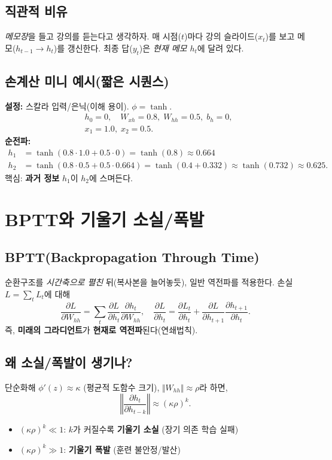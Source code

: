 \documentclass[12pt]{article}
\begin{document}
\subsection*{직관적 비유}
\emph{메모장}을 들고 강의를 듣는다고 생각하자. 매 시점($t$)마다 강의 슬라이드($x_t$)를 보고 메모($h_{t-1}\to h_t$)를 갱신한다. 최종 답($y_t$)은 \emph{현재 메모 $h_t$}에 달려 있다.

\subsection{손계산 미니 예시(짧은 시퀀스)}
\textbf{설정:} 스칼라 입력/은닉(이해 용이). $\phi=\tanh$.
\[
\begin{aligned}
&h_0=0,\quad W_{xh}=0.8,\; W_{hh}=0.5,\; b_h=0,\\
&x_1=1.0,\; x_2=0.5.
\end{aligned}
\]
\textbf{순전파:}
\[
\begin{aligned}
h_1 &= \tanh(0.8\cdot 1.0 + 0.5\cdot 0) = \tanh(0.8)\approx 0.664\\
h_2 &= \tanh(0.8\cdot 0.5 + 0.5\cdot 0.664) = \tanh(0.4+0.332)\approx \tanh(0.732)\approx 0.625.
\end{aligned}
\]
핵심: \textbf{과거 정보} $h_1$이 $h_2$에 스며든다.

\section{BPTT와 기울기 소실/폭발}
\subsection{BPTT(Backpropagation Through Time)}
순환구조를 \emph{시간축으로 펼친} 뒤(복사본을 늘어놓듯), 일반 역전파를 적용한다. 손실 $L=\sum_t L_t$에 대해
\[
\frac{\partial L}{\partial W_{hh}} = \sum_t \frac{\partial L}{\partial h_t}\frac{\partial h_t}{\partial W_{hh}},\quad
\frac{\partial L}{\partial h_t} = \frac{\partial L_t}{\partial h_t} + \frac{\partial L}{\partial h_{t+1}}\frac{\partial h_{t+1}}{\partial h_t}.
\]
즉, \textbf{미래의 그라디언트}가 \textbf{현재로 역전파}된다(연쇄법칙).

\subsection{왜 소실/폭발이 생기나?}
단순화해 $\phi'(z)\approx \kappa$ (평균적 도함수 크기), $\Vert W_{hh}\Vert\approx \rho$라 하면,
\[
\left\Vert \frac{\partial h_t}{\partial h_{t-k}}\right\Vert \approx (\kappa\rho)^k.
\]
\begin{itemize}
  \item $(\kappa\rho)^k \ll 1$: $k$가 커질수록 \textbf{기울기 소실} (장기 의존 학습 실패)
  \item $(\kappa\rho)^k \gg 1$: \textbf{기울기 폭발} (훈련 불안정/발산)
\end{itemize}
\end{document}
